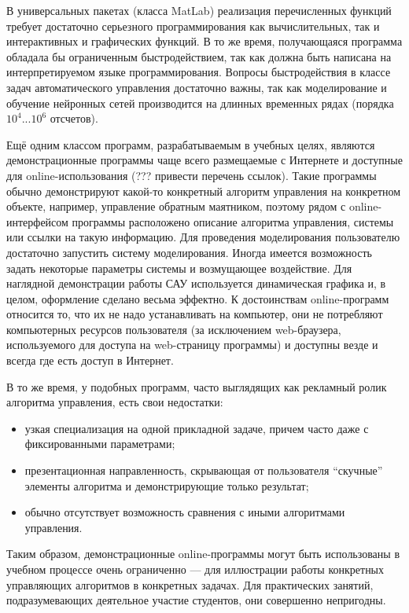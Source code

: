 В универсальных пакетах (класса MatLab) реализация перечисленных
функций требует достаточно серьезного программирования как
вычислительных, так и интерактивных и графических функций.  В то же
время, получающаяся программа обладала бы ограниченным
быстродействием, так как должна быть написана на интерпретируемом
языке программирования.  Вопросы быстродействия в классе задач
автоматического управления достаточно важны, так как моделирование и
обучение нейронных сетей производится на длинных временных рядах
(порядка $10^4 ... 10^6$ отсчетов).

Ещё одним классом программ, разрабатываемым в учебных целях, являются
демонстрационные программы чаще всего размещаемые с Интернете и
доступные для online-использования (??? привести перечень ссылок).
Такие программы обычно демонстрируют какой-то конкретный алгоритм
управления на конкретном объекте, например, управление обратным
маятником, поэтому рядом с online-интерфейсом программы расположено
описание алгоритма управления, системы или ссылки на такую информацию.
Для проведения моделирования пользователю достаточно запустить систему
моделирования.  Иногда имеется возможность задать некоторые параметры
системы и возмущающее воздействие.  Для наглядной демонстрации работы
САУ используется динамическая графика и, в целом, оформление сделано
весьма эффектно.  К достоинствам online-программ относится то, что их
не надо устанавливать на компьютер, они не потребляют компьютерных
ресурсов пользователя (за исключением web-браузера, используемого для
доступа на web-страницу программы) и доступны везде и всегда где есть
доступ в Интернет.

В то же время, у подобных программ, часто выглядящих как рекламный
ролик алгоритма управления, есть свои недостатки:
\begin{itemize}

\item узкая специализация на одной прикладной задаче, причем часто
  даже с фиксированными параметрами;

\item презентационная направленность, скрывающая от пользователя
  ``скучные'' элементы алгоритма и демонстрирующие только результат;

\item обычно отсутствует возможность сравнения с иными алгоритмами
  управления.

\end{itemize}

Таким образом, демонстрационные online-программы могут быть
использованы в учебном процессе очень ограниченно --- для иллюстрации
работы конкретных управляющих алгоритмов в конкретных задачах.  Для
практических занятий, подразумевающих деятельное участие студентов,
они совершенно непригодны.

